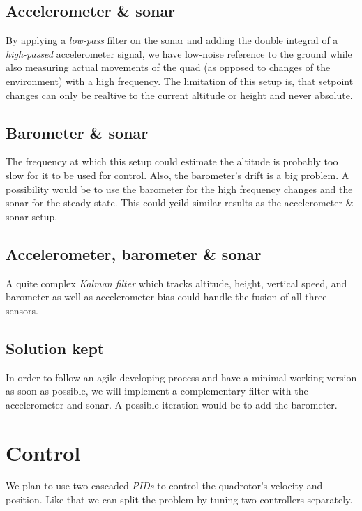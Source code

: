 \documentclass{repMobRob}
\begin{document}
\subsection{Accelerometer \& sonar}
By applying a \emph{low-pass} filter on the sonar and adding the double integral of a \emph{high-passed} accelerometer signal, we have low-noise reference to the ground while also measuring actual movements of the quad (as opposed to changes of the environment) with a high frequency.
The limitation of this setup is, that setpoint changes can only be realtive to the current altitude or height and never absolute.

\subsection{Barometer \& sonar}
The frequency at which this setup could estimate the altitude is probably too slow for it to be used for control.
Also, the barometer's drift is a big problem.
A possibility would be to use the barometer for the high frequency changes and the sonar for the steady-state.
This could yeild similar results as the accelerometer \& sonar setup.

\subsection{Accelerometer, barometer \& sonar}
A quite complex \emph{Kalman filter} which tracks altitude, height, vertical speed, and barometer as well as accelerometer bias could handle the fusion of all three sensors.

\subsection{Solution kept}
In order to follow an agile developing process and have a minimal working version as soon as possible, we will implement a complementary filter with the accelerometer and sonar.
A possible iteration would be to add the barometer.

\section{Control}
We plan to use two cascaded \emph{PIDs} to control the quadrotor's velocity and position. Like that we can split the problem by tuning two controllers separately.
\end{document}
